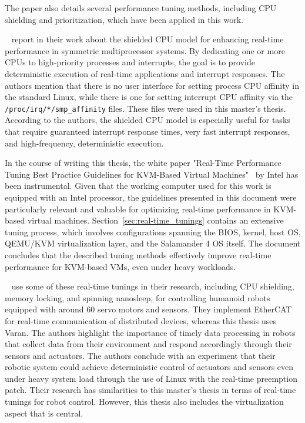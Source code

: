 \documentclass[MMR,Master,english]{style/twbook}
\begin{document}
\noindent The paper also details several performance tuning methods, including CPU shielding and prioritization, which have been applied in this work.

\clearpage

\bigskip \noindent \citeauthor{broskyShieldedProcessorsGuaranteeing2003}~\cite{broskyShieldedProcessorsGuaranteeing2003} report in their work about the shielded CPU model for enhancing real-time performance in symmetric multiprocessor systems. By dedicating one or more CPUs to high-priority processes and interrupts, the goal is to provide deterministic execution of real-time applications and interrupt responses. The authors mention that there is no user interface for setting process CPU affinity in the standard Linux, while there is one for setting interrupt CPU affinity via the \texttt{/proc/irq/*/smp\_affinity} files. These files were used in this master's thesis. According to the authors, the shielded CPU model is especially useful for tasks that require guaranteed interrupt response times, very fast interrupt responses, and high-frequency, deterministic execution.

\bigskip \noindent In the course of writing this thesis, the white paper "Real-Time Performance Tuning Best Practice Guidelines for KVM-Based Virtual Machines"~\cite{RealTimePerformanceTuning2022} by Intel has been instrumental. Given that the working computer used for this work is equipped with an Intel processor, the guidelines presented in this document were particularly relevant and valuable for optimizing real-time performance in KVM-based virtual machines. Section~\ref{sec:real-time_tunings} contains an extensive tuning process, which involves configurations spanning the BIOS, kernel, host OS, QEMU/KVM virtualization layer, and the Salamander 4 OS itself. The document concludes that the described tuning methods effectively improve real-time performance for KVM-based VMs, even under heavy workloads.

\bigskip \noindent \citeauthor{yoonRealTimePerformanceAnalysis2009}~\cite{yoonRealTimePerformanceAnalysis2009} use some of these real-time tunings in their research, including CPU shielding, memory locking, and spinning nanosleep, for controlling humanoid robots equipped with around 60 servo motors and sensors. They implement EtherCAT for real-time communication of distributed devices, whereas this thesis uses Varan. The authors highlight the importance of timely data processing in robots that collect data from their environment and respond accordingly through their sensors and actuators. The authors conclude with an experiment that their robotic system could achieve deterministic control of actuators and sensors even under heavy system load through the use of Linux with the real-time preemption patch. Their research has similarities to this master's thesis in terms of real-time tunings for robot control. However, this thesis also includes the virtualization aspect that is central.
\end{document}
